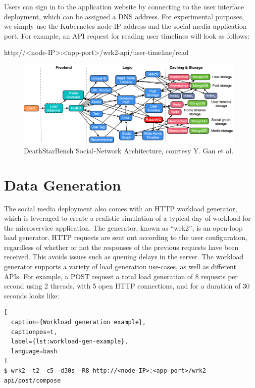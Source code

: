 Users can sign in to the application website by connecting to the user interface deployment, which can be assigned a DNS address. For experimental purposes, we simply use the Kubernetes node IP address and the social media application port. For example, an API request for reading user timelines will look as follows:\par

http://<node-IP>:<app-port>/wrk2-api/user-timeline/read

\begin{figure}[htb]
    \centering
    \caption{DeathStarBench Social-Network Architecture, courtesy Y. Gan et al. \cite{gan2019open}}
    \label{fig:social}
    \includegraphics[width=1.0\linewidth]{Figures/Social-Network-Architecture.pdf}
\end{figure}

\section{Data Generation}
\label{sec:data-generation}

The social media deployment also comes with an HTTP workload generator, which
is leveraged to create a realistic simulation of a typical day of workload for the microservice application. The generator, known as ``wrk2'', is an open-loop load generator. HTTP requests are sent out according to the user configuration, regardless of whether or not the responses of the previous requests have been received. This avoids issues such as queuing delays in the server. The workload generator supports a variety of load generation use-cases, as well as different APIs. For example, a POST request a total load generation of 8 requests per second using 2 threads, with 5 open HTTP connections, and for a duration of 30 seconds looks like:\par

\begin{lstlisting}[
  caption={Workload generation example},
  captionpos=t,
  label={lst:workload-gen-example},
  language=bash
]
$ wrk2 -t2 -c5 -d30s -R8 http://<node-IP>:<app-port>/wrk2-api/post/compose
\end{lstlisting}

